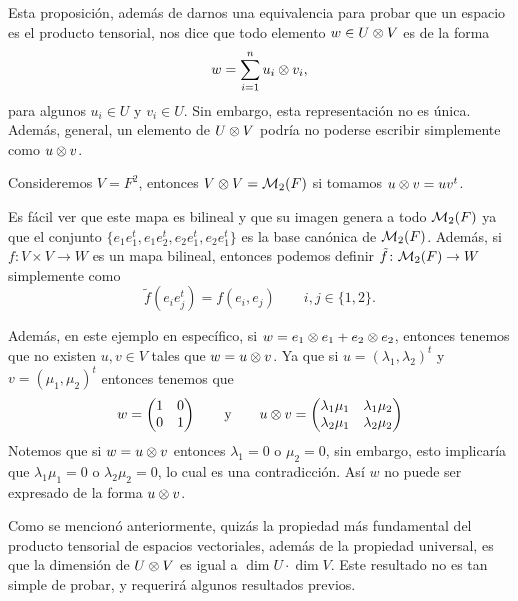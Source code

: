 Esta proposición, además de darnos una equivalencia para probar que un espacio es el producto tensorial, nos dice que todo elemento $w \in U \otimes V$ es de la forma
\[
  w = \sum_{i=1}^n u_i \otimes v_i,
\]
para algunos $u_i \in U$ y $v_i \in U$. Sin embargo, esta representación no es única. Además, general, un elemento de $U \otimes V$ podría no poderse escribir simplemente como $u \otimes v$.

\begin{example}
  Consideremos $V = F^2$, entonces $V \otimes V = \mathcal{M}_2(F)$ si tomamos $u \otimes v = uv^t$. 

  Es fácil ver que este mapa es bilineal y que su imagen genera a todo $\mathcal{M}_2(F)$ ya que el conjunto $\{e_1 e_1^t, e_1 e_2^t, e_2 e_1^t, e_2 e_1^t\}$ es la base canónica de $\mathcal{M}_2(F)$. Además, si $f\colon V \times V \to W$ es un mapa bilineal, entonces podemos definir $\tilde f \colon \mathcal{M}_2(F) \to W$ simplemente como
  \[
    \tilde f ( e_i e_j^t) = f(e_i, e_j)   \qquad i,j \in \{ 1,2\}.
  \]
  

  Además, en este ejemplo en específico, si $w = e_1 \otimes e_1 + e_2 \otimes e_2$, entonces tenemos que no existen $u,v \in V$ tales que $w = u \otimes v $. Ya que si $u = (\lambda_1, \lambda_2)^t$ y $v = (\mu_1, \mu_2)^t$ entonces tenemos que
  \[
    w = \begin{pmatrix}1 & 0 \\ 0 & 1\end{pmatrix} 
    \qquad\text{y}\qquad
    u \otimes v = 
      \begin{pmatrix}
        \lambda_1 \mu_1 & \lambda_1 \mu_2 \\
        \lambda_2 \mu_1 & \lambda_2 \mu_2
      \end{pmatrix}
  \]
  Notemos que si $w = u \otimes v$ entonces $\lambda_1 = 0$ o $\mu_2 = 0$, sin embargo, esto implicaría que $\lambda_1\mu_1 = 0$ o $\lambda_2\mu_2 = 0$, lo cual es una contradicción. Así $w$ no puede ser expresado de la forma $u \otimes v$.
\end{example}

Como se mencionó anteriormente, quizás la propiedad más fundamental del producto tensorial de espacios vectoriales, además de la propiedad universal, es que la dimensión de $U \otimes V$ es igual a $\dim U \cdot \dim V$. Este resultado no es tan simple de probar, y requerirá algunos resultados previos.


